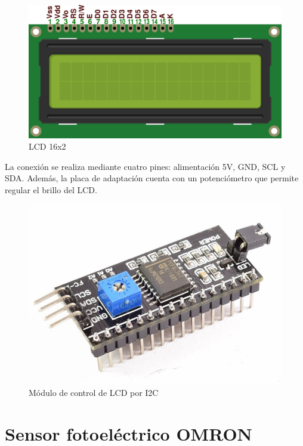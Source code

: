 \begin{figure}[hbtp]
	\centering
	\includegraphics[scale=0.25]{02-hardware/07-lcd162.png}
	\caption{LCD 16x2}
	\label{fig:figura27}
	\end{figure}

La conexión se realiza mediante cuatro pines: alimentación 5V, GND, SCL y SDA.
Además, la placa de adaptación cuenta con un potenciómetro que permite regular
el brillo del LCD.

\begin{figure}[hbtp]
    \centering
    \includegraphics[scale=1]{02-hardware/08-modulo-adaptador-lcd-a-i2c.jpg}
    \caption{Módulo de control de LCD por I2C}
    \label{fig:figura28}
    \end{figure}

\section{Sensor fotoeléctrico OMRON}

